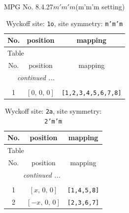 \documentclass[fleqn,8pt]{jsarticle}
\begin{document}
\setcounter{MaxMatrixCols}{32}

\renewcommand{\tablename}{Table~}
\renewcommand{\figurename}{Figure~}
\begin{center}
\LARGE
MPG No. 8.4.27\quad$m'm'm$\quad(m'm'm setting)
\end{center}
\renewcommand{\arraystretch}{1.2}
\begin{longtable}{ccc}
\caption{Wyckoff site: {\tt 1o}, site symmetry: {\tt m'm'm}}
 \\
 \hline \hline
No. & position & mapping \\ \hline \endfirsthead

\multicolumn{2}{l}{\tablename\ \thetable{}} \\
 \hline \hline
No. & position & mapping \\ \hline \endhead

 \hline \hline
\multicolumn{2}{r}{\footnotesize\it continued ...} \\ \endfoot

 \hline \hline
\multicolumn{2}{r}{} \\ \endlastfoot

1 & $\left[ 0,\, 0,\, 0 \right]$ & {\tt [1,2,3,4,5,6,7,8]} \\
\end{longtable}
\renewcommand{\arraystretch}{1.2}
\begin{longtable}{ccc}
\caption{Wyckoff site: {\tt 2a}, site symmetry: {\tt 2'm'm}}
 \\
 \hline \hline
No. & position & mapping \\ \hline \endfirsthead

\multicolumn{2}{l}{\tablename\ \thetable{}} \\
 \hline \hline
No. & position & mapping \\ \hline \endhead

 \hline \hline
\multicolumn{2}{r}{\footnotesize\it continued ...} \\ \endfoot

 \hline \hline
\multicolumn{2}{r}{} \\ \endlastfoot

1 & $\left[ x,\, 0,\, 0 \right]$ & {\tt [1,4,5,8]} \\ \hline
2 & $\left[ - x,\, 0,\, 0 \right]$ & {\tt [2,3,6,7]} \\
\end{longtable}
\renewcommand{\arraystretch}{1.2}
\end{document}
